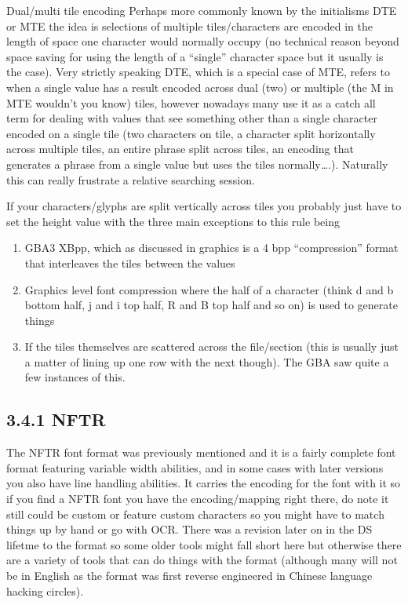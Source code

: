 \documentclass[
]{book}
\providecommand{\tightlist}{%
  \setlength{\itemsep}{0pt}\setlength{\parskip}{0pt}}
\begin{document}
Dual/multi tile encoding Perhaps more commonly known by the initialisms DTE or MTE the idea is selections of multiple tiles/characters are encoded in the length of space one character would normally occupy (no technical reason beyond space saving for using the length of a ``single'' character space but it usually is the case). Very strictly speaking DTE, which is a special case of MTE, refers to when a single value has a result encoded across dual (two) or multiple (the M in MTE wouldn't you know) tiles, however nowadays many use it as a catch all term for dealing with values that see something other than a single character encoded on a single tile (two characters on tile, a character split horizontally across multiple tiles, an entire phrase split across tiles, an encoding that generates a phrase from a single value but uses the tiles normally\ldots.). Naturally this can really frustrate a relative searching session.

If your characters/glyphs are split vertically across tiles you probably just have to set the height value with the three main exceptions to this rule being

\begin{enumerate}
\def\labelenumi{\arabic{enumi}.}
\tightlist
\item
  GBA3 XBpp, which as discussed in graphics is a 4 bpp ``compression'' format that interleaves the tiles between the values
\item
  Graphics level font compression where the half of a character (think d and b bottom half, j and i top half, R and B top half and so on) is used to generate things
\item
  If the tiles themselves are scattered across the file/section (this is usually just a matter of lining up one row with the next though). The GBA saw quite a few instances of this.
\end{enumerate}

\hypertarget{nftr}{%
\subsection{3.4.1 NFTR}\label{nftr}}

The NFTR font format was previously mentioned and it is a fairly complete font format featuring variable width abilities, and in some cases with later versions you also have line handling abilities. It carries the encoding for the font with it so if you find a NFTR font you have the encoding/mapping right there, do note it still could be custom or feature custom characters so you might have to match things up by hand or go with OCR. There was a revision later on in the DS lifetme to the format so some older tools might fall short here but otherwise there are a variety of tools that can do things with the format (although many will not be in English as the format was first reverse engineered in Chinese language hacking circles).
\end{document}
